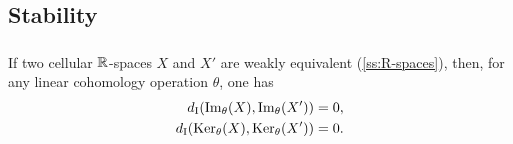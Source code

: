 \subsection{Stability}\label{ss:stability}




%
%

\subsubsection{}\label{lem:w.h.e. preservance}

\lemma If two cellular $\mathbb{R}$-spaces $X$ and $X'$ are weakly equivalent (\cref{ss:R-spaces}), then, for any linear cohomology operation $\theta$, one has
\[
\begin{split}
	d_{\mathrm{I}}(\operatorname{Im}_\theta(X), \operatorname{Im}_\theta(X')) &= 0, \\
	d_{\mathrm{I}}(\operatorname{Ker}_\theta(X), \operatorname{Ker}_\theta(X')) &= 0.
\end{split}
\]

